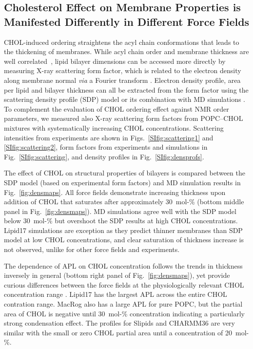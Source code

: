 \documentclass[journal=jctcce]{achemso}
\begin{document}
\subsection{Cholesterol Effect on Membrane Properties is Manifested Differently in Different Force Fields}

CHOL-induced ordering straightens the acyl chain conformations that leads to the thickening of membranes. While acyl chain order and membrane thickness are well correlated~\cite{NMRlipidsDatabank}, lipid bilayer dimensions can be accessed more directly by measuring X-ray scattering form factor, which is related to the electron density along membrane normal \textit{via} a Fourier transform \cite{pan12,Heftberger15,Marquardt15,ollila16}. Electron density profile, area per lipid and bilayer thickness can all be extracted from the form factor using the scattering density profile (SDP) model or its combination with MD simulations  \cite{Kucerka08a,pan12,Heftberger15,Marquardt15,doktorova2020molecular}. To complement the evaluation of CHOL ordering effect against NMR order parameters, we measured also X-ray scattering form factors from POPC--CHOL mixtures with systematically increasing CHOL concentrations. Scattering intensities from experiments are shown in Figs.~\ref{SIfig:scattering1} and \ref{SIfig:scattering2}, form factors from experiments and simulations in Fig.~\ref{SIfig:scattering}, and density profiles in Fig.~\ref{SIfig:densprofs}.


The effect of CHOL on structural properties of bilayers is compared between the SDP model (based on experimental form factors) and MD simulation results in Fig.~\ref{fig:densmaps}.  All force fields demonstrate increasing thickness upon addition of CHOL that saturates after approximately 30~mol-\% (bottom middle panel in Fig.~\ref{fig:densmaps}). MD simulations agree well with the SDP model below 30~mol-\% but overshoot the SDP results at high CHOL concentrations. Lipid17 simulations are exception as they predict thinner membranes than SDP model at low CHOL concentrations, and clear saturation of thickness increase is not observed, unlike for other force fields and experiments.

The dependence of APL on CHOL concentration follows the trends in thickness inversely in general (bottom right panel of Fig.~\ref{fig:densmaps}), yet provide curious differences between the force fields at the physiologically relevant CHOL concentration range \cite{van2008membrane}. Lipid17 has the largest APL across the entire CHOL contration range. MacRog also has a large APL for pure POPC, but the partial area of CHOL is negative until 30~mol-\% concentration indicating a particularly strong condensation effect. The profiles for Slipids and CHARMM36 are very similar with the small or zero CHOL partial area until a concentration of 20~mol-\%. 
\end{document}
